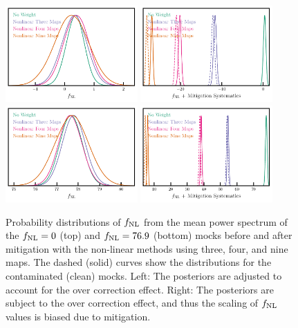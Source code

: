 \begin{figure}
\centering
\includegraphics[width=0.45\textwidth]{figures/mcmc_cont.pdf}
\includegraphics[width=0.45\textwidth]{figures/mcmc_contnoshift.pdf}
\includegraphics[width=0.45\textwidth]{figures/mcmcp_cont.pdf}
\includegraphics[width=0.45\textwidth]{figures/mcmcp_contnoshift.pdf}
\caption{Probability distributions of $f_{\rm NL}$ from the mean power spectrum of the $f_{\rm NL}=0$ (top) and $f_{\rm NL}=76.9$ (bottom) mocks before and after mitigation with the non-linear methods using three, four, and nine maps. The dashed (solid) curves show the distributions for the contaminated (clean) mocks. Left: The posteriors are adjusted to account for the over correction effect. Right: The posteriors are subject to the over correction effect, and thus the scaling of $f_{\rm NL}$ values is biased due to mitigation.}\label{fig:contmcmc}
\end{figure}


